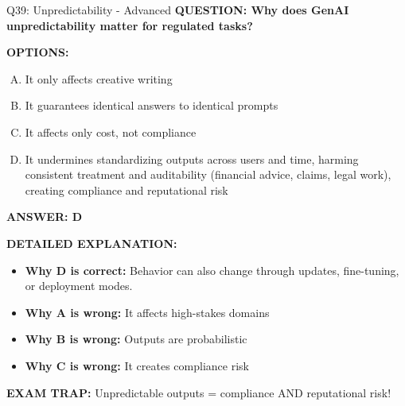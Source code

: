 \documentclass[8pt]{beamer}
\begin{document}
\begin{frame}[shrink=6]{Q39: Unpredictability - Advanced}
\fontsize{6.5}{7.5}\selectfont
\textbf{QUESTION: Why does GenAI unpredictability matter for regulated tasks?}

\vspace{0.1cm}
\textbf{OPTIONS:}
\begin{enumerate}[A.]
\item It only affects creative writing
\item It guarantees identical answers to identical prompts
\item It affects only cost, not compliance
\item It undermines standardizing outputs across users and time, harming consistent treatment and auditability (financial advice, claims, legal work), creating compliance and reputational risk
\end{enumerate}

\vspace{0.1cm}
\textcolor{myblue}{\textbf{ANSWER: D}}

\vspace{0.1cm}
\textbf{DETAILED EXPLANATION:}
\begin{itemize}
\item \textbf{Why D is correct:} Behavior can also change through updates, fine-tuning, or deployment modes.
\item \textbf{Why A is wrong:} It affects high-stakes domains
\item \textbf{Why B is wrong:} Outputs are probabilistic
\item \textbf{Why C is wrong:} It creates compliance risk
\end{itemize}

\textcolor{myred}{\textbf{EXAM TRAP:}} Unpredictable outputs = compliance AND reputational risk!
\end{frame}
\end{document}
